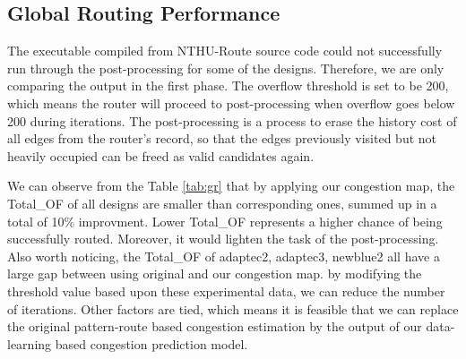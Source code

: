 \subsection{Global Routing Performance}
The executable compiled from NTHU-Route source code could not successfully run through the post-processing for some of the designs. Therefore, we are only comparing the output in the first phase. The overflow threshold is set to be 200, which means the router will proceed to post-processing when overflow goes below 200 during iterations. The post-processing is a process to erase the history cost of all edges from the router's record, so that the edges previously visited but not heavily occupied can be freed as valid candidates again. 

We can observe from the Table \ref{tab:gr} that by applying our congestion map, the Total\_OF of all designs are smaller than corresponding ones, summed up in a total of 10\% improvment. Lower Total\_OF represents a higher chance of being successfully routed. Moreover, it would lighten the task of the post-processing. Also worth noticing, the Total\_OF of adaptec2, adaptec3, newblue2 all have a large gap between using original and our congestion map. by modifying the threshold value based upon these experimental data, we can reduce the number of iterations. Other factors are tied, which means it is feasible that we can replace the original pattern-route based congestion estimation by the output of our data-learning based congestion prediction model.


